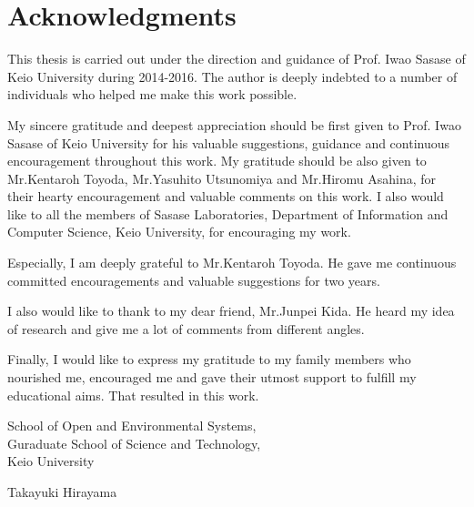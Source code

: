 
\chapter*{Acknowledgments}

This thesis is carried out under the direction and guidance of Prof. Iwao Sasase of Keio University during 2014-2016.
The author is deeply indebted to a number of individuals who helped me make this work possible.

My sincere gratitude and deepest appreciation should be first given to Prof. Iwao Sasase of Keio University for his valuable suggestions, guidance and continuous encouragement throughout this work.
My gratitude should be also given to Mr.Kentaroh Toyoda, Mr.Yasuhito Utsunomiya and Mr.Hiromu Asahina, for their hearty encouragement and valuable comments on this work.
I also would like to all the members of Sasase Laboratories, Department of Information and Computer Science, Keio University, for encouraging my work.

Especially, I am deeply grateful to Mr.Kentaroh Toyoda.
He gave me continuous committed encouragements and valuable suggestions for two years.

I also would like to thank to my dear friend, Mr.Junpei Kida.
He heard my idea of research and give me a lot of comments from different angles.

Finally, I would like to express my gratitude to my family members who nourished me, encouraged me and gave their utmost support to fulfill my educational aims.
That resulted in this work. 

\sl
\vspace{1.5cm}
\begin{flushleft}\baselineskip=18pt
School of Open and Environmental Systems,\\ Guraduate School of Science and Technology,\\
Keio University
\end{flushleft}

\bf
\vspace{0.5cm}
\begin{flushright}
Takayuki Hirayama\\
\end{flushright}
